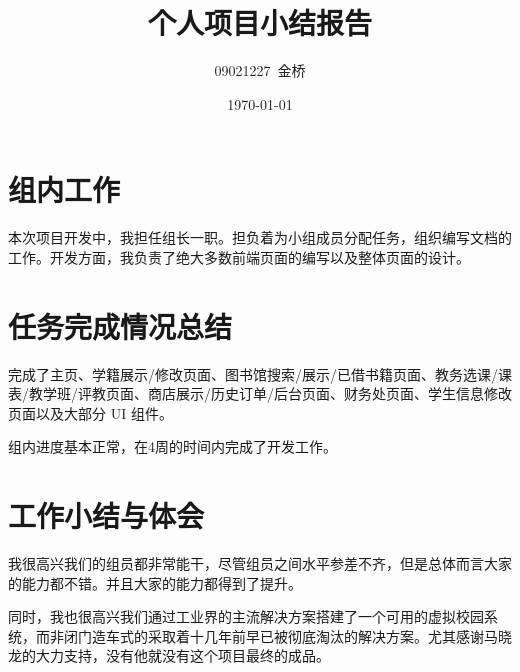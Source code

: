\documentclass{article}
\title{个人项目小结报告}
\author{09021227~金桥}
\date{\today}
\begin{document}
\maketitle

\section{组内工作}

本次项目开发中，我担任组长一职。担负着为小组成员分配任务，组织编写文档的工作。开发方面，我负责了绝大多数前端页面的编写以及整体页面的设计。

\section{任务完成情况总结}

完成了主页、学籍展示/修改页面、图书馆搜索/展示/已借书籍页面、教务选课/课表/教学班/评教页面、商店展示/历史订单/后台页面、财务处页面、学生信息修改页面以及大部分 UI 组件。

组内进度基本正常，在4周的时间内完成了开发工作。

\section{工作小结与体会}

我很高兴我们的组员都非常能干，尽管组员之间水平参差不齐，但是总体而言大家的能力都不错。并且大家的能力都得到了提升。

同时，我也很高兴我们通过工业界的主流解决方案搭建了一个可用的虚拟校园系统，而非闭门造车式的采取着十几年前早已被彻底淘汰的解决方案。尤其感谢马晓龙的大力支持，没有他就没有这个项目最终的成品。
\end{document}
